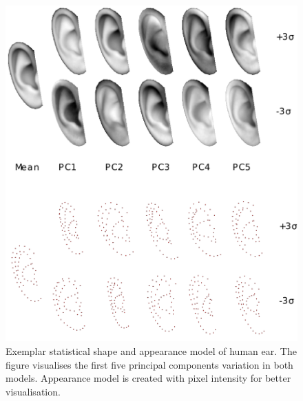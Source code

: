 \begin{figure}[t!]
    \includegraphics[width=\columnwidth]{resources/Ear_Deformable_Model/models/AAM_model}
    \caption{Exemplar statistical shape and appearance model of human ear. The figure visualises the first five principal components variation in both models. Appearance model is created with pixel intensity for better visualisation.}
    \label{fig:aam_model}
\end{figure}





